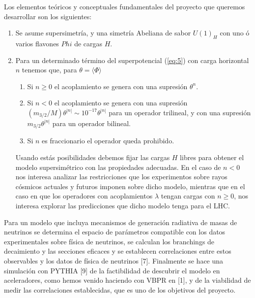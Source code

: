 \begin{ideas}
  

Los elementos teóricos y conceptuales fundamentales del proyecto que queremos desarrollar
son los siguientes:

\begin{enumerate}
\item Se asume supersimetría, y una simetría Abeliana de sabor $U(1)_H$ con uno ó varios flavones $Phi$ de cargas $H$.

\item Para un determinado término del superpotencial (\ref{eq:5}) con carga horizontal $n$ tenemos que, para $\theta=\langle\Phi\rangle$
  \begin{enumerate}
  \item Si $n\ge 0$ el acoplamiento se genera con una supresión $\theta^n$.
  \item Si $n<0$ el acoplamiento se genera con una supresión $(m_{3/2}/M)\theta^{|n|}\sim 10^{-17}\theta^{|n|}$ para un operador trilineal, y con una supresión $m_{3/2}\theta^{|n|}$ para un operador bilineal.
  \item Si $n$ es fraccionario el operador queda prohibido.
  \end{enumerate}
Usando estás posibilidades debemos fijar las cargas $H$ libres para obtener el modelo supersimétrico con las propiedades adecuadas. %
En el caso de $n<0$ nos interesa analizar las restricciones que los experimentos sobre rayos cósmicos actuales y futuros imponen sobre dicho modelo, mientras que en el caso en que los operadores con acoplamientos $\lambda$ tengan cargas con $n\ge 0$, nos interesa explorar las predicciones que dicho modelo tenga para el LHC.
\end{enumerate}

Para un modelo que incluya mecanismos de generación radiativa de masas de neutrinos se determina el espacio de parámetros compatible con los datos experimentales sobre física de neutrinos, se calculan los branchings de decaimiento y las secciones eficaces y se establecen correlaciones entre estos observables y los datos de física de neutrinos [7]. Finalmente se hace una simulación con PYTHIA [9] de la factibilidad de descubrir el modelo en aceleradores, como hemos venido haciendo con VBPR en [1], y de la viabilidad de medir las correlaciones establecidas, que es uno de los objetivos del proyecto.


\end{ideas}
